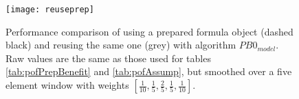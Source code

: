 \begin{figure}[h]
\centering
\texttt{[image: reuseprep]}
\caption[Performance comparison of using a prepared formula object and reusing the same one.]{Performance comparison of using a prepared formula object (dashed black) and reusing the same one (grey) with algorithm $PB0_{model}$. Raw values are the same as those used for tables \ref{tab:pofPrepBenefit} and \ref{tab:pofAssump}, but smoothed over a five element window with weights $[\frac{1}{10},\frac{1}{5},\frac{2}{5},\frac{1}{5},\frac{1}{10}]$.}
\label{fig:reusePrep}
\end{figure}


